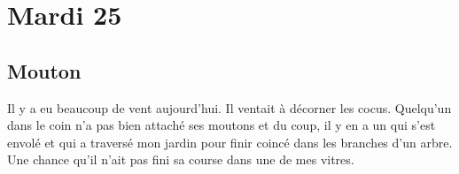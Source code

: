 ﻿\section{Mardi 25}
\subsection{Mouton}
Il y a eu beaucoup de vent aujourd’hui. Il ventait à décorner les cocus. Quelqu’un dans le coin n’a pas bien attaché ses moutons et du coup, il y en a un qui s’est envolé et qui a traversé mon jardin pour finir coincé dans les branches d’un arbre. Une chance qu’il n’ait pas fini sa course dans une de mes vitres.

